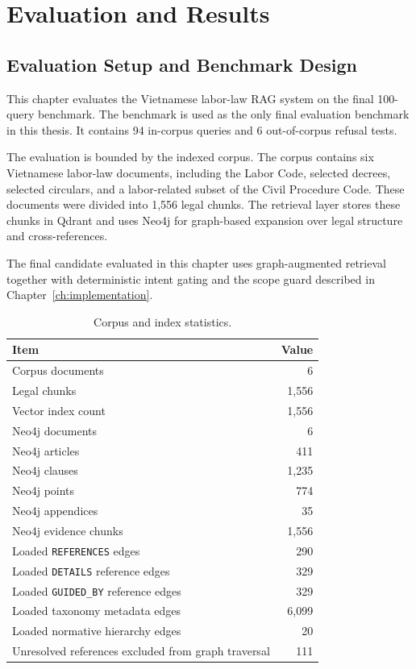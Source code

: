 \chapter{Evaluation and Results}

\section{Evaluation Setup and Benchmark Design}
\label{sec:evaluation-setup-and-benchmark-design}

This chapter evaluates the Vietnamese labor-law RAG system on the final 100-query benchmark. The benchmark is used as the only final evaluation benchmark in this thesis. It contains 94 in-corpus queries and 6 out-of-corpus refusal tests.

The evaluation is bounded by the indexed corpus. The corpus contains six Vietnamese labor-law documents, including the Labor Code, selected decrees, selected circulars, and a labor-related subset of the Civil Procedure Code. These documents were divided into 1,556 legal chunks. The retrieval layer stores these chunks in Qdrant and uses Neo4j for graph-based expansion over legal structure and cross-references.

The final candidate evaluated in this chapter uses graph-augmented retrieval together with deterministic intent gating and the scope guard described in Chapter~\ref{ch:implementation}.

\begin{table}[H]
  \centering
  \caption{Corpus and index statistics.}
  \label{tab:corpus-index-statistics}
  \begin{tabular}{lr}
    \toprule
    Item & Value \\
    \midrule
    Corpus documents & 6 \\
    Legal chunks & 1,556 \\
    Vector index count & 1,556 \\
    Neo4j documents & 6 \\
    Neo4j articles & 411 \\
    Neo4j clauses & 1,235 \\
    Neo4j points & 774 \\
    Neo4j appendices & 35 \\
    Neo4j evidence chunks & 1,556 \\
    Loaded \texttt{REFERENCES} edges & 290 \\
    Loaded \texttt{DETAILS} reference edges & 329 \\
    Loaded \texttt{GUIDED\_BY} reference edges & 329 \\
    Loaded taxonomy metadata edges & 6,099 \\
    Loaded normative hierarchy edges & 20 \\
    Unresolved references excluded from graph traversal & 111 \\
    \bottomrule
  \end{tabular}
\end{table}

